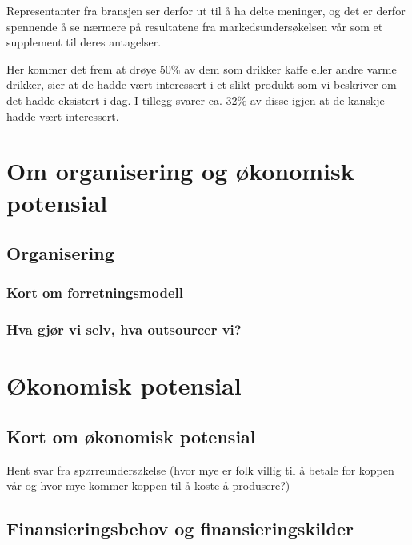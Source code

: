 Representanter fra bransjen ser derfor ut til å ha delte meninger, og det er derfor spennende å se nærmere på resultatene fra markedsundersøkelsen vår som et supplement til deres antagelser.

Her kommer det frem at drøye 50\% av dem som drikker kaffe eller andre varme drikker, sier at de hadde vært interessert i et slikt produkt som vi beskriver om det hadde eksistert i dag. I tillegg svarer ca. 32\% av disse igjen at de kanskje hadde vært interessert.



\section{Om organisering og økonomisk potensial}

\subsection{Organisering}

\subsubsection{Kort om forretningsmodell}

\subsubsection{Hva gjør vi selv, hva outsourcer vi?}

\section{Økonomisk potensial}

\subsection{Kort om økonomisk potensial}
Hent svar fra spørreundersøkelse (hvor mye er folk villig til å betale for koppen vår og hvor mye kommer koppen til å koste å produsere?)
\subsection{Finansieringsbehov og finansieringskilder}
